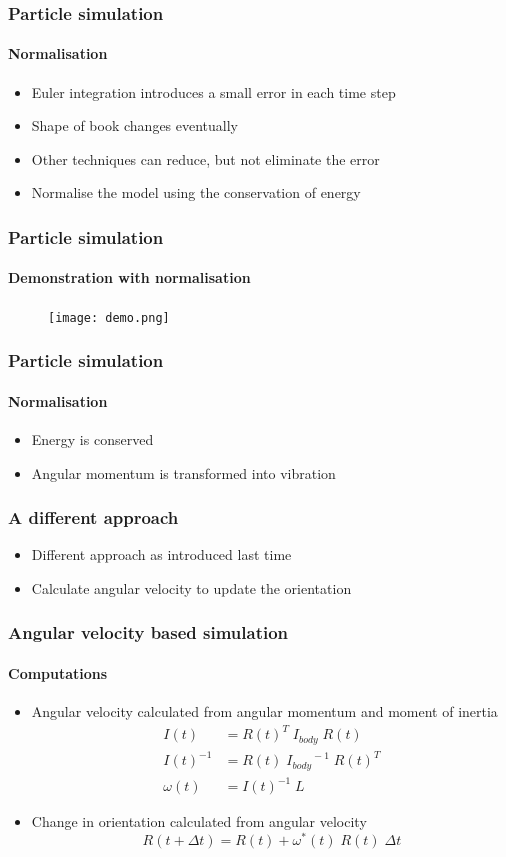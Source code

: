\documentclass{beamer}
\begin{document}
\begin{frame}
 \frametitle{Particle simulation}
 \framesubtitle{Normalisation}
 \begin{itemize}
  \item Euler integration introduces a small error in each time step
  \item Shape of book changes eventually
  \item Other techniques can reduce, but not eliminate the error
  \item Normalise the model using the conservation of energy
 \end{itemize}
\end{frame}

\begin{frame}
 \frametitle{Particle simulation}
 \framesubtitle{Demonstration with normalisation}
 \begin{figure}
  \centering
  \texttt{[image: demo.png]}
 \end{figure}
\end{frame}

\begin{frame}
 \frametitle{Particle simulation}
 \framesubtitle{Normalisation}
 \begin{itemize}
  \item Energy is conserved
  \item Angular momentum is transformed into vibration
 \end{itemize}
\end{frame}

\begin{frame}
 \frametitle{A different approach}
 \begin{itemize}
  \item Different approach as introduced last time
  \item Calculate angular velocity to update the orientation
 \end{itemize}
\end{frame}

\begin{frame}
 \frametitle{Angular velocity based simulation}
 \framesubtitle{Computations}
 \begin{itemize}
  \item Angular velocity calculated from angular momentum and moment of inertia
  \begin{align*}
  I(t) &= R(t)^T \; I_{body} \; R(t) \\
  I(t)^{-1} &= R(t) \; {I_{body}}^{\!\!-1} \; R(t)^T \\
  \omega(t) &= I(t)^{-1} \; L
  \end{align*}
  \item Change in orientation calculated from angular velocity
  \begin{displaymath}
  R(t + \Delta t) = R(t) + \omega^*\!(t) \; R(t)  \;  \Delta t
  \end{displaymath}
 \end{itemize}
\end{frame}
\end{document}
